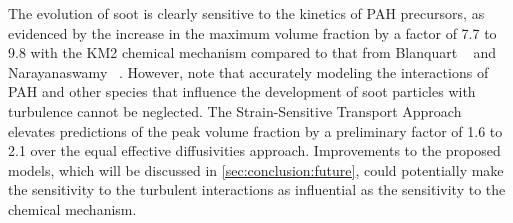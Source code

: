 The evolution of soot is clearly sensitive to the kinetics of PAH precursors, as evidenced by the increase in the maximum volume fraction by a factor of 7.7 to 9.8 with the KM2 chemical mechanism compared to that from Blanquart \etal~\cite{blanquart2009} and Narayanaswamy \etal~\cite{narayanaswamy2010}. However, note that accurately modeling the interactions of PAH and other species that influence the development of soot particles with turbulence cannot be neglected. The Strain-Sensitive Transport Approach elevates predictions of the peak volume fraction by a preliminary factor of 1.6 to 2.1 over the equal effective diffusivities approach. Improvements to the proposed models, which will be discussed in \cref{sec:conclusion:future}, could potentially make the sensitivity to the turbulent interactions as influential as the sensitivity to the chemical mechanism.



